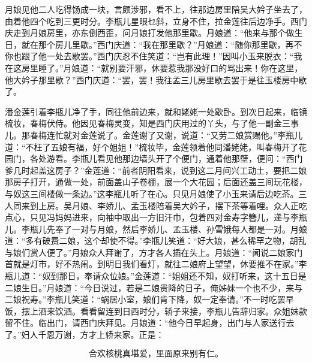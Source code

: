 月娘见他二人吃得饧成一块，言颇涉邪，看不上，往那边房里陪吴大妗子坐去了，由着他四个吃到三更时分。李瓶儿星眼乜斜，立身不住，拉金莲往后边净手。西门庆走到月娘房里，亦东倒西歪，问月娘打发他那里歇。月娘道：“他来与那个做生日，就在那个房儿里歇。”西门庆道：“我在那里歇？”月娘道：“随你那里歇，再不你也跟了他一处去歇罢。”西门庆忍不住笑道：“岂有此理！”因叫小玉来脱衣：“我在这房里睡了。”月娘道：“就别要汗邪，休要惹我那没好口的骂出来！你在这里，他大妗子那里歇？”西门庆道：“罢，罢！我往孟三儿房里歇去罢于是往玉楼房中歇了。

潘金莲引着李瓶儿净了手，同往他前边来，就和姥姥一处歇卧。到次日起来，临镜梳妆，春梅伏侍。他因见春梅灵变，知是西门庆用过的丫头，与了他一副金三事儿。那春梅连忙就对金莲说了。金莲谢了又谢，说道：“又劳二娘赏赐他。”李瓶儿道：“不枉了五娘有福，好个姐姐！”梳妆毕，金莲领着他同潘姥姥，叫春梅开了花园门，各处游看。李瓶儿看见他那边墙头开了个便门，通着他那壁，便问：“西门爹几时起盖这房子？”金莲道：“前者阴阳看来，说到这二月间兴工动土，要把二娘那房子打开，通做一处，前面盖山子卷棚，展一个大花园；后面还盖三间玩花楼，与奴这三间楼做一条边。”这李瓶儿听了在心。只见月娘使了小玉来请后边吃茶。三人同来到上房。吴月娘、李娇儿、孟玉楼陪着吴大妗子，摆下茶等着哩。众人正吃点心，只见冯妈妈进来，向袖中取出一方旧汗巾，包着四对金寿字簪儿，递与李瓶儿。李瓶儿先奉了一对与月娘，然后李娇儿、孟玉楼、孙雪娥每人都是一对。月娘道：“多有破费二娘，这个却使不得。”李瓶儿笑道：“好大娘，甚么稀罕之物，胡乱与娘们赏人便了。”月娘众人拜谢了，方才各人插在头上。月娘道：“闻说二娘家门首就是灯市，好不热闹。到明日我们看灯，就往二娘府上望望，休要推不在家。”李瓶儿道：“奴到那日，奉请众位娘。”金莲道：“姐姐还不知，奴打听来，这十五日是二娘生日。”月娘道：“今日说过，若是二娘贵降的日子，俺姊妹一个也不少，来与二娘祝寿。”李瓶儿笑道：“蜗居小室，娘们肯下降，奴一定奉请。”不一时吃罢早饭，摆上酒来饮酒。看看留连到日西时分，轿子来接，李瓶儿告辞归家。众姐妹款留不住。临出门，请西门庆拜见。月娘道：“他今日早起身，出门与人家送行去了。”妇人千恩万谢，方才上轿来家。正是：

\[
合欢核桃真堪爱，里面原来别有仁。
\]
